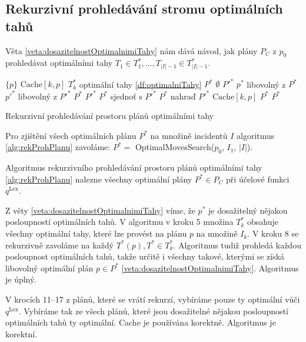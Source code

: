 \clearpage

\subsection{Rekurzivní prohledávání stromu optimálních tahů}

Věta \ref{veta:dosazitelnostOptimalnimiTahy} nám dává návod, jak plány $P_C$ z $p_0$ prohledávat optimálními tahy $T_1 \in T^*_1, \dots , T_{|I| - 1} \in T^*_{|I|-1}$.

\begin{algorithm}[H]
  \begin{algorithmic}[1]
      \State \Return $\{ p \}$
      \State \Return $\text{Cache}[k, p]$
    \EndIf
    \State $T^*_k$ \gets optimální tahy \ref{df:optimalniTahy}
    \State $P^*$ \gets $\emptyset$
      \State $P'^*$ \gets {}
      \State $p^*$ \gets libovolný z $P^*$
      \State $p'^*$ \gets libovolný z $P'^*$
        \State $P^*$ \gets $P'^*$ 
        \State $P^*$ sjednoť s $P'^*$
        \State $P^*$ nahraď $P'^*$
      \EndIf
    \EndFor
    \State $\text{Cache}[k, p]$ \gets $P^*$
    \State \Return $P^*$
  \EndFunction
  \end{algorithmic}
  \caption{Rekurzivní prohledávání prostoru plánů optimálními tahy}
  \label{alg:rekProhPlanu}
\end{algorithm}

Pro zjištění všech optimálních plánu $P^*$ na množině incidentů $I$ algoritmus \ref{alg:rekProhPlanu} zavoláme: $P^* = $ OptimalMovesSearch($p_0$, $I_1$, $|I|$).

\begin{veta}\label{}
  Algoritmus rekurzivního prohledávání prostoru plánů optimálními tahy \ref{alg:rekProhPlanu} nalezne všechny optimální plány $P^* \in P_C$ při účelové funkci $q^{\text{Lex}}$.
\end{veta}
\begin{dukaz}
  Z věty \ref{veta:dosazitelnostOptimalnimiTahy} víme, že $p^*$ je dosažitelný nějakou posloupností optimálních tahů. 
  V algoritmu v kroku 5 množina $T^*_k$ obsahuje všechny optimální tahy, které lze provést na plánu $p$ na množině $I_k$.
  V kroku 8 se rekurzivně zavoláme na každý $T^*(p), T^* \in T^*_k$.
  Algoritmus tudiž prohledá každou posloupnost optimálních tahů, takže určitě i všechny takové, kterými se získá libovolný optimální plán $p \in P^*$ \ref{veta:dosazitelnostOptimalnimiTahy}.
  Algoritmus je úplný.

  V krocích 11--17 z plánů, které se vrátí rekurzí, vybíráme pouze ty optimální vůči $q^{\text{Lex}}$.
  Vybíráme tak ze všech plánů, které jsou dosažitelné nějakou posloupností optimálních tahů ty optimální.
  Cache je používána korektně.
  Algoritmus je korektní.
\end{dukaz}

